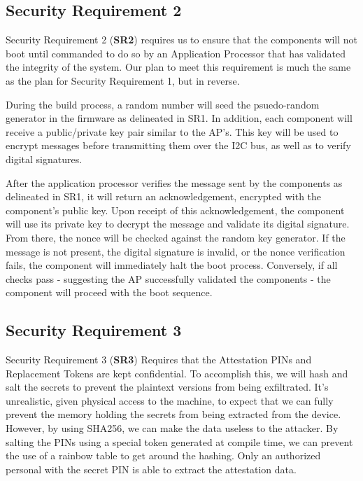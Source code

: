 \documentclass{prace}
\begin{document}
\subsection{Security Requirement 2}
Security Requirement 2 (\textbf{SR2}) requires us to ensure that the components will not boot until commanded
to do so by an Application Processor that has validated the integrity of the system. Our plan to
meet this requirement is much the same as the plan for Security Requirement 1, but in reverse.

During the build process, a random number will seed the psuedo-random generator in the firmware as delineated in 
SR1. In addition, each component will receive a public/private key pair similar to the AP's.
This key will be used to encrypt messages before transmitting them over the I2C bus, as well
as to verify digital signatures.

After the application processor verifies the message sent by the components as delineated
in SR1, it will return an acknowledgement, encrypted with the component's public key. Upon
receipt of this acknowledgement, the component will use its private key to decrypt the 
message and validate its digital signature. From there, the nonce will be checked against
the random key generator. If the message is not present, the digital signature is invalid,
or the nonce verification fails, the component will immediately halt the boot process.
Conversely, if all checks pass - suggesting the AP successfully validated the components -
the component will proceed with the boot sequence.

\subsection{Security Requirement 3}

Security Requirement 3 (\textbf{SR3}) Requires that the Attestation PINs and Replacement Tokens are kept confidential.
To accomplish this, we will hash and salt the secrets to prevent the plaintext versions from being exfiltrated.
It's unrealistic, given physical access to the machine, to expect that we can fully prevent the memory holding
the secrets from being extracted from the device. However, by using SHA256, we can make the data useless to the
attacker. By salting the PINs using a special token generated at compile time, we can prevent the use of a rainbow
table to get around the hashing. Only an authorized personal with the secret PIN is able to extract the attestation data.
\end{document}
